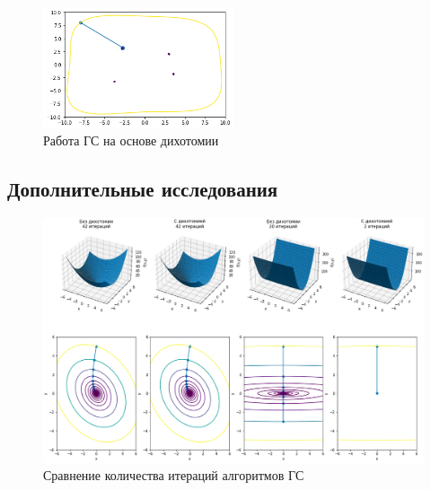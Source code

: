\newpage

\begin{figure}[ht]
    \centering
    \includegraphics[width=0.5\textwidth]{images/g32.png}
    \caption{Работа ГС на основе дихотомии}
    \label{fig:g32}
\end{figure}

\begin{landscape}
\section{Дополнительные исследования}
\begin{vplace}[1.0]
\begin{figure}[ht]
    \centering
    \includegraphics[width=1.0\textwidth]{images/4a.png}
    \caption{Сравнение количества итераций алгоритмов ГС}
    \label{fig:4a}
\end{figure}
\end{vplace}
\end{landscape}


